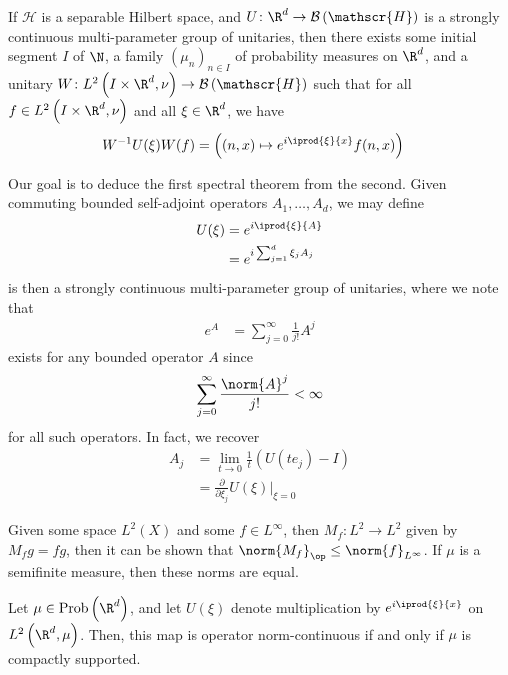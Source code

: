 \documentclass[10pt]{mypackage}
\begin{document}
\begin{theorem}
  If $ \mathscr{H} $ is a separable Hilbert space, and $U\colon \R^d\to \mathcal{B}\left( \mathscr{H} \right)$ is a strongly continuous multi-parameter group of unitaries, then there exists some initial segment $I$ of $\N$, a family $\left( \mu_n \right)_{n\in I}$ of probability measures on $\R^d$, and a unitary $W\colon L^2\left( I\times\R^d, \nu \right)\to \mathcal{B}\left( \mathscr{H} \right)$ such that for all $f\in L^2\left( I\times \R^d,\nu \right)$ and all $\xi\in \R^d$, we have
  \begin{align*}
    W^{-1}U(\xi)W(f) &= \left( \left( n,x \right) \mapsto e^{i \iprod{\xi}{x}}f(n,x) \right)
  \end{align*}
\end{theorem}
Our goal is to deduce the first spectral theorem from the second. Given commuting bounded self-adjoint operators $A_1,\dots,A_d$, we may define
\begin{align*}
  U(\xi) &= e^{i \iprod{\xi}{A}}\\
         &= e^{i \sum_{j=1}^{d}\xi_jA_j}
\end{align*}
is then a strongly continuous multi-parameter group of unitaries, where we note that
\begin{align*}
  e^{A} &= \sum_{j=0}^{\infty} \frac{1}{j!}A^{j}
\end{align*}
exists for any bounded operator $A$ since
\begin{align*}
  \sum_{j=0}^{\infty} \frac{\norm{A}^{j}}{j!} < \infty
\end{align*}
for all such operators. In fact, we recover
\begin{align*}
  A_j &= \lim_{t\to 0} \frac{1}{t} \left( U\left( te_j \right) - I \right)\\
      &= \frac{\partial}{\partial \xi_j}U\left( \xi \right)\biggr\vert_{\xi = 0}
\end{align*}
\begin{remark}
  Given some space $L^2(X)$ and some $f\in L^{\infty}$, then $M_f\colon L^2\to L^2$ given by $M_fg = fg$, then it can be shown that $\norm{M_f}_{\op}\leq \norm{f}_{L^{\infty}}$. If $\mu$ is a semifinite measure, then these norms are equal.
\end{remark}
\begin{proposition}
  Let $\mu\in \operatorname{Prob}\left( \R^d \right)$, and let $U(\xi)$ denote multiplication by $e^{i \iprod{\xi}{x}}$ on $L^2\left( \R^d,\mu \right)$. Then, this map is operator norm-continuous if and only if $\mu$ is compactly supported.
\end{proposition}
\end{document}
